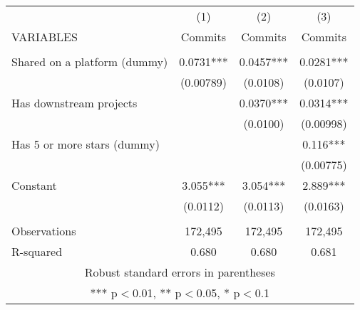 \begin{tabular}{lccc} \hline
 & (1) & (2) & (3) \\
VARIABLES & Commits & Commits & Commits \\ \hline
 &  &  &  \\
Shared on a platform (dummy) & 0.0731*** & 0.0457*** & 0.0281*** \\
 & (0.00789) & (0.0108) & (0.0107) \\
Has downstream projects &  & 0.0370*** & 0.0314*** \\
 &  & (0.0100) & (0.00998) \\
Has 5 or more stars (dummy) &  &  & 0.116*** \\
 &  &  & (0.00775) \\
Constant & 3.055*** & 3.054*** & 2.889*** \\
 & (0.0112) & (0.0113) & (0.0163) \\
 &  &  &  \\
Observations & 172,495 & 172,495 & 172,495 \\
 R-squared & 0.680 & 0.680 & 0.681 \\ \hline
\multicolumn{4}{c}{ Robust standard errors in parentheses} \\
\multicolumn{4}{c}{ *** p$<$0.01, ** p$<$0.05, * p$<$0.1} \\
\end{tabular}
